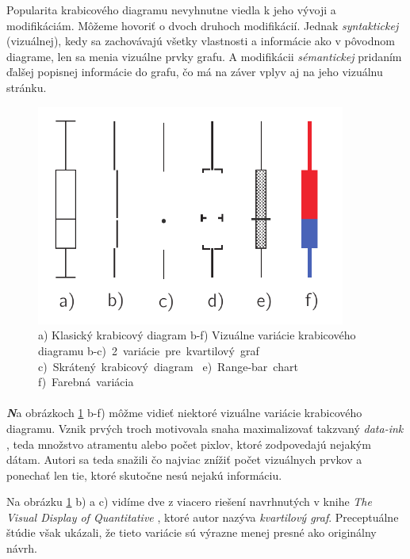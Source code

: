 Popularita krabicového diagramu nevyhnutne viedla k jeho vývoji a modifikáciám. Môžeme hovoriť o dvoch druhoch modifikácií. Jednak \textit{syntaktickej} (vizuálnej), kedy sa zachovávajú všetky vlastnosti a informácie ako v pôvodnom diagrame, len sa menia vizuálne prvky grafu. A modifikácii \textit{sémantickej} pridaním ďalšej popisnej informácie do grafu, čo má na záver vplyv aj na jeho vizuálnu stránku.


\begin{figure}
	\centering
	\includegraphics[width = 4in]{boxplot2}
	\caption{ a) Klasický krabicový diagram  b-f) Vizuálne variácie krabicového diagramu \mbox{b-c) 2 variácie pre kvartilový graf \cite{Tufte83}} \mbox{c) Skrátený krabicový diagram \cite{VisualSummaryPotter}} \mbox{e) \mbox{Range-bar} chart \cite{Spear}} \mbox{f) Farebná variácia \cite{Carr}}  }
	\label{fig:boxplotmodif1}
\end{figure}


\paragraph{}
{\large \textbf{\textit{N}}}a obrázkoch \ref{fig:boxplotmodif1} b-f) môžme vidieť niektoré vizuálne variácie krabicového diagramu. Vznik prvých troch motivovala snaha maximalizovať takzvaný \textit{data-ink} \cite{Tufte83}, teda množstvo atramentu alebo počet pixlov, ktoré zodpovedajú nejakým dátam. Autori sa teda snažili čo najviac znížiť počet vizuálnych prvkov a ponechať len tie, ktoré skutočne nesú nejakú informáciu. 

Na obrázku \ref{fig:boxplotmodif1} b) a c) vidíme dve z viacero riešení navrhnutých v knihe \textit{The Visual Display of Quantitative} \cite{Tufte83}, ktoré autor nazýva \textit{kvartilový graf}. Preceptuálne štúdie \cite{Stock} však ukázali, že tieto variácie sú výrazne menej presné ako originálny návrh.


